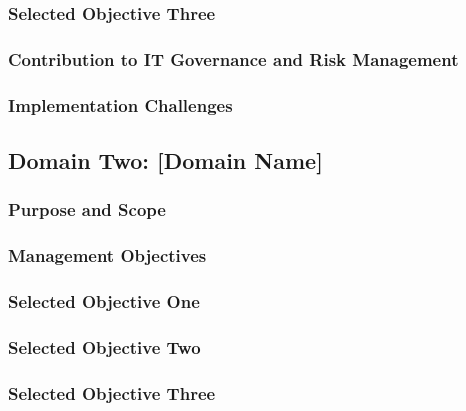 
\subsubsection{Selected Objective Three}


\subsubsection{Contribution to IT Governance and Risk Management}

\subsubsection{Implementation Challenges}


\subsection{Domain Two: [Domain Name]}

\subsubsection{Purpose and Scope}

\subsubsection{Management Objectives}


\subsubsection{Selected Objective One}


\subsubsection{Selected Objective Two}


\subsubsection{Selected Objective Three}

